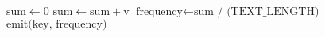 \begin{algorithm}
\begin{algorithmic}[1]
        \EndProcedure
    
        \Statex
            \State $\text{sum} \gets 0$
                \State $\text{sum} \gets \text{sum} + \text{v}$
            \EndFor
            \State  $\text{frequency} \gets \text{sum / (TEXT\_LENGTH)}$
            \State $\text{emit(key, frequency)}$
        \EndProcedure
    \EndClass
    \end{algorithmic}
    
    \end{algorithm}













